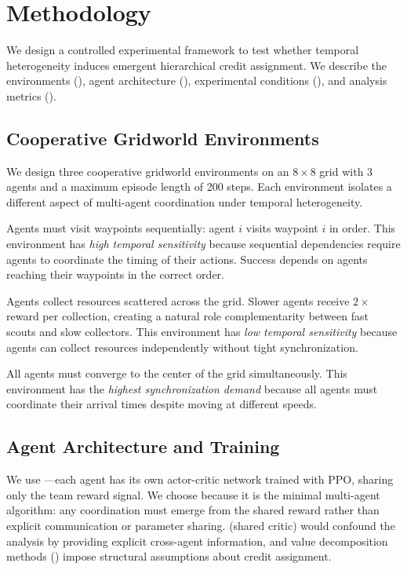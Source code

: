 \section{Methodology}
\label{sec:method}

We design a controlled experimental framework to test whether temporal heterogeneity induces emergent hierarchical credit assignment. We describe the environments (), agent architecture (), experimental conditions (), and analysis metrics ().

\subsection{Cooperative Gridworld Environments}
\label{sec:envs}

We design three cooperative gridworld environments on an $8 \times 8$ grid with 3 agents and a maximum episode length of 200 steps. Each environment isolates a different aspect of multi-agent coordination under temporal heterogeneity.

 Agents must visit waypoints sequentially: agent $i$ visits waypoint $i$ in order. This environment has \emph{high temporal sensitivity} because sequential dependencies require agents to coordinate the timing of their actions. Success depends on agents reaching their waypoints in the correct order.

 Agents collect resources scattered across the grid. Slower agents receive $2\times$ reward per collection, creating a natural role complementarity between fast scouts and slow collectors. This environment has \emph{low temporal sensitivity} because agents can collect resources independently without tight synchronization.

 All agents must converge to the center of the grid simultaneously. This environment has the \emph{highest synchronization demand} because all agents must coordinate their arrival times despite moving at different speeds.

\subsection{Agent Architecture and Training}
\label{sec:agents}

 We use \ippo---each agent has its own actor-critic network trained with PPO, sharing only the team reward signal. We choose \ippo because it is the minimal multi-agent algorithm: any coordination must emerge from the shared reward rather than explicit communication or parameter sharing. \mappo (shared critic) would confound the analysis by providing explicit cross-agent information, and value decomposition methods (\eg \qmix) impose structural assumptions about credit assignment.

